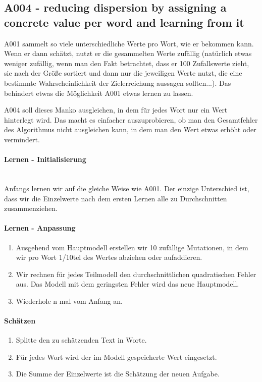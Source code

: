 \newpage{}

\subsection{A004 - reducing dispersion by assigning a concrete value per
word and learning from
it}

A001 sammelt so viele unterschiedliche Werte pro Wort, wie er bekommen kann. 
Wenn er dann schätzt, nutzt er die gesammelten Werte zufällig (natürlich etwas weniger zufällig, wenn man den Fakt betrachtet, dass er 100 Zufallswerte zieht, sie nach der Größe sortiert und dann nur die jeweiligen Werte nutzt, die eine bestimmte Wahrscheinlichkeit der Zielerreichung aussagen sollten...).
Das behindert etwas die Möglichkeit A001 etwas lernen zu lassen.

A004 soll dieses Manko ausgleichen, in dem für jedes Wort nur ein Wert hinterlegt wird. Das macht es einfacher auszuprobieren, ob man den Gesamtfehler des Algorithmus nicht ausgleichen kann, in dem man den Wert etwas erhöht oder vermindert.

\paragraph{Lernen - Initialisierung}\mbox{}\\

Anfangs lernen wir auf die gleiche Weise wie A001. 
Der einzige Unterschied ist, dass wir die Einzelwerte nach dem ersten Lernen alle zu Durchschnitten zusammenziehen. 

\paragraph{Lernen - Anpassung}

\begin{enumerate}
        \tightlist
        \item Ausgehend vom Hauptmodell erstellen wir 10 zufällige Mutationen, in dem wir pro Wort 1/10tel des Wertes abziehen oder aufaddieren.
        \item Wir rechnen für jedes Teilmodell den durchschnittlichen quadratischen Fehler aus. Das Modell mit dem geringsten Fehler wird das neue Hauptmodell.
        \item Wiederhole n mal vom Anfang an.
\end{enumerate}

\paragraph{Schätzen}

\begin{enumerate}
        \tightlist
        \item Splitte den zu schätzenden Text in Worte.
        \item Für jedes Wort wird der im Modell gespeicherte Wert eingesetzt.
        \item Die Summe der Einzelwerte ist die Schätzung der neuen Aufgabe.
\end{enumerate}


